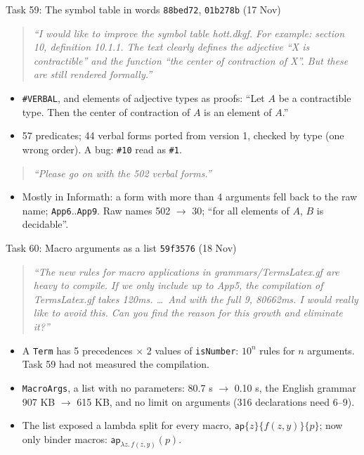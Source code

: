 \documentclass[10pt,aspectratio=169]{beamer}
\newcommand{\bad}[1]{\textcolor{warn}{#1}}
\newcommand{\ok}[1]{\textcolor{good}{#1}}
\newcommand{\commit}[1]{\texttt{\footnotesize #1}}
\newcommand{\prompt}[1]{\begin{quote}\small\itshape ``#1''\end{quote}}
\begin{document}
\begin{frame}{Task 59: The symbol table in words}
  \commit{88bed72}, \commit{01b278b} (17 Nov)
  \prompt{I would like to improve the symbol table hott.dkgf. For example: section 10, definition
  10.1.1. The text clearly defines the adjective ``X is contractible'' and the function ``the center
  of contraction of X''. But these are still rendered formally.}
  \begin{itemize}\small
    \item \texttt{\#VERBAL}, and elements of adjective types as proofs: \ok{``Let $A$ be a
          contractible type. Then the center of contraction of $A$ is an element of $A$.''}
    \item 57 predicates; 44 verbal forms ported from version 1, checked by type (one wrong
          order). A bug: \bad{\texttt{\#10} read as \texttt{\#1}}.
  \end{itemize}
  \prompt{Please go on with the 502 verbal forms.}
  \begin{itemize}\small
    \item Mostly in Informath: a form with more than 4 arguments fell back to the raw name;
          \texttt{App6}..\texttt{App9}. Raw names \ok{502 $\to$ 30}; ``for all elements of
          $A$, $B$ is decidable''.
  \end{itemize}
\end{frame}

\begin{frame}{Task 60: Macro arguments as a list}
  \commit{59f3576} (18 Nov)
  \prompt{The new rules for macro applications in grammars/TermsLatex.gf are heavy to compile. If we
  only include up to App5, the compilation of TermsLatex.gf takes 120ms. \ldots\ And with the full
  9, 80662ms. I would really like to avoid this. Can you find the reason for this growth and
  eliminate it?}
  \begin{itemize}\small
    \item A \texttt{Term} has 5 precedences $\times$ 2 values of \texttt{isNumber}: \bad{$10^n$
          rules} for $n$ arguments. Task 59 had not measured the compilation.
    \item \texttt{MacroArgs}, a list with no parameters: \ok{80.7 s $\to$ 0.10 s}, the English
          grammar 907 KB $\to$ 615 KB, and no limit on arguments (316 declarations need 6--9).
    \item The list exposed a lambda split for every macro, \bad{$\mathsf{ap}\{z\}\{f(z,y)\}\{p\}$};
          now only binder macros: $\mathsf{ap}_{\lambda z.\, f(z,y)}(p)$.
  \end{itemize}
\end{frame}
\end{document}
